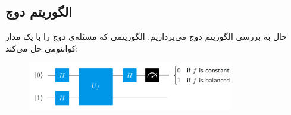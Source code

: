 \documentclass{book}
\begin{document}
\subsection{الگوریتم دوچ}

حال به بررسی الگوریتم دوچ می‌پردازیم. الگوریتمی که مسئله‌ی دوچ را با یک مدار کوانتومی حل می‌کند:\\
\begin{center}
\begin{figure}[ht]
	\centering
	\includegraphics[width=0.8\textwidth]{Deutsch algorithm.png}
	\caption{}
\end{figure}
\end{center}
\end{document}
